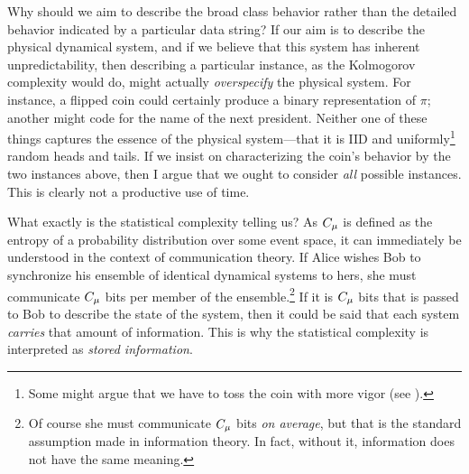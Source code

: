 Why should we aim to describe the broad class behavior rather than the detailed behavior indicated by a particular data string? If our aim is to describe the physical dynamical system, and if we believe that this system has inherent unpredictability, then describing a particular instance, as the Kolmogorov complexity would do, might actually \emph{overspecify} the physical system. For instance, a flipped coin could certainly produce a binary representation of $\pi$; another might code for the name of the next president. Neither one of these things captures the essence of the physical system---that it is IID and uniformly\footnote{Some might argue that we have to toss the coin with more vigor (see ).} random heads and tails. If we insist on characterizing the coin's behavior by the two instances above, then I argue that we ought to consider \emph{all} possible instances. This is clearly not a productive use of time.

What exactly is the statistical complexity telling us? As $C_\mu$ is defined as the entropy of a probability distribution over some event space, it can immediately be understood in the context of communication theory. If Alice wishes Bob to synchronize his ensemble of identical dynamical systems to hers, she must communicate $C_\mu$ bits per member of the ensemble.\footnote{Of course she must communicate $C_\mu$ bits \emph{on average}, but that is the standard assumption made in information theory. In fact, without it, information does not have the same meaning.} If it is $C_\mu$ bits that is passed to Bob to describe the state of the system, then it could be said that each system \emph{carries} that amount of information. This is why the statistical complexity is interpreted as \emph{stored information}.

